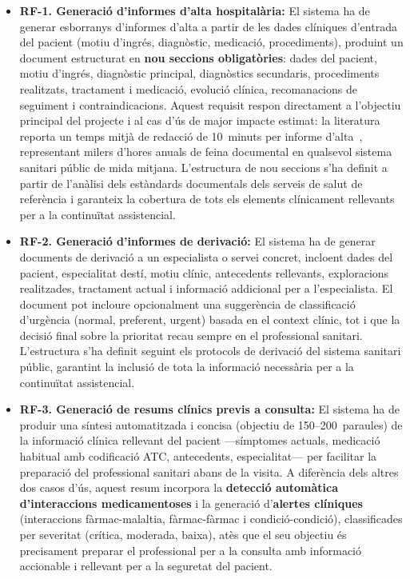 \documentclass[CAT]{TFUOC}%
\begin{document}
\begin{itemize}
    \item \textbf{RF-1. Generació d'informes d'alta hospitalària:} El sistema ha de generar esborranys d'informes d'alta a partir de les dades clíniques d'entrada del pacient (motiu d'ingrés, diagnòstic, medicació, procediments), produint un document estructurat en \textbf{nou seccions obligatòries}: dades del pacient, motiu d'ingrés, diagnòstic principal, diagnòstics secundaris, procediments realitzats, tractament i medicació, evolució clínica, recomanacions de seguiment i contraindicacions. Aquest requisit respon directament a l'objectiu principal del projecte i al cas d'ús de major impacte estimat: la literatura reporta un temps mitjà de redacció de 10~minuts per informe d'alta~\cite{chua2024discharge}, representant milers d'hores anuals de feina documental en qualsevol sistema sanitari públic de mida mitjana. L'estructura de nou seccions s'ha definit a partir de l'anàlisi dels estàndards documentals dels serveis de salut de referència i garanteix la cobertura de tots els elements clínicament rellevants per a la continuïtat assistencial.

    \item \textbf{RF-2. Generació d'informes de derivació:} El sistema ha de generar documents de derivació a un especialista o servei concret, incloent dades del pacient, especialitat destí, motiu clínic, antecedents rellevants, exploracions realitzades, tractament actual i informació addicional per a l'especialista. El document pot incloure opcionalment una suggerència de classificació d'urgència (normal, preferent, urgent) basada en el context clínic, tot i que la decisió final sobre la prioritat recau sempre en el professional sanitari. L'estructura s'ha definit seguint els protocols de derivació del sistema sanitari públic, garantint la inclusió de tota la informació necessària per a la continuïtat assistencial.

    \item \textbf{RF-3. Generació de resums clínics previs a consulta:} El sistema ha de produir una síntesi automatitzada i concisa (objectiu de 150--200~paraules) de la informació clínica rellevant del pacient ---símptomes actuals, medicació habitual amb codificació ATC, antecedents, especialitat--- per facilitar la preparació del professional sanitari abans de la visita. A diferència dels altres dos casos d'ús, aquest resum incorpora la \textbf{detecció automàtica d'interaccions medicamentoses} i la generació d'\textbf{alertes clíniques} (interaccions fàrmac-malaltia, fàrmac-fàrmac i condició-condició), classificades per severitat (crítica, moderada, baixa), atès que el seu objectiu és precisament preparar el professional per a la consulta amb informació accionable i rellevant per a la seguretat del pacient.


\end{itemize}
\end{document}
